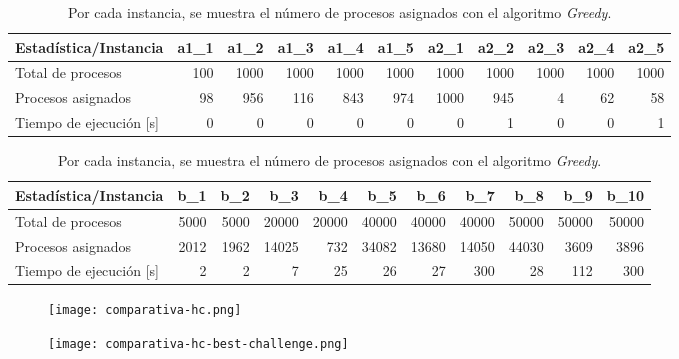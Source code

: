 \documentclass[../informe2.tex]{subfiles}
\begin{document}
\begin{table}[h]
	\small
	\centering
	\begin{tabular}{@{}lrrrrrrrrrr@{}}
		\toprule
		Estadística/Instancia       & a1\_1 & a1\_2 & a1\_3 & a1\_4 & a1\_5 & a2\_1 & a2\_2 & a2\_3 & a2\_4 & a2\_5 \\ \midrule
		Total de procesos           & 100   & 1000  & 1000  & 1000  & 1000  & 1000  & 1000  & 1000  & 1000  & 1000  \\
		Procesos asignados          & 98    & 956   & 116   & 843   & 974   & 1000  & 945   & 4     & 62    & 58    \\
		Tiempo de ejecución {[}s{]} & 0     & 0     & 0     & 0     & 0     & 0     & 1     & 0     & 0     & 1     \\ %
	\end{tabular}
	
	\bigskip
	
	\begin{tabular}{@{}lrrrrrrrrrr@{}}
		Estadística/Instancia       & b\_1 & b\_2 & b\_3  & b\_4  & b\_5  & b\_6  & b\_7  & b\_8  & b\_9  & b\_10 \\ \midrule
		Total de procesos           & 5000 & 5000 & 20000 & 20000 & 40000 & 40000 & 40000 & 50000 & 50000 & 50000 \\
		Procesos asignados          & 2012 & 1962 & 14025 & 732   & 34082 & 13680 & 14050 & 44030 & 3609  & 3896  \\
		Tiempo de ejecución {[}s{]} & 2    & 2    & 7     & 25    & 26    & 27    & 300   & 28    & 112   & 300   \\ \bottomrule
	\end{tabular}
	\caption{\small Por cada instancia, se muestra el número de procesos asignados con el algoritmo \textit{Greedy}.}
	\label{tabla:greedy}
\end{table}


\begin{figure}[ht]
	\centering
	\texttt{[image: comparativa-hc.png]}
	\caption{\small}
	\label{fig:comparativa-hc}
\end{figure}

\begin{figure}[ht]
	\centering
	\texttt{[image: comparativa-hc-best-challenge.png]}
	\caption{\small}
	\label{fig:comparativa-hc-best-challenge}
\end{figure}
\end{document}
